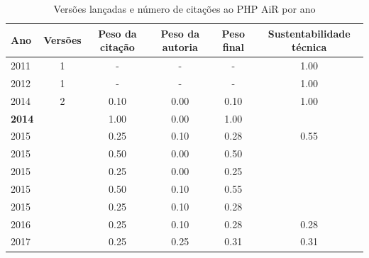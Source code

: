 \begin{table}[H]
\caption{Versões lançadas e número de citações ao PHP AiR por ano}
\centering
\begin{tabular}{| l | c | c | c | c | c |}
  \hline
  Ano & Versões & Peso da citação & Peso da autoria & Peso final & Sustentabilidade técnica \\
  \hline
        2011 & 1 & - & - & -
        &
          {\color{blue} 1.00}
        \\
\hline
        2012 & 1 & - & - & -
        &
          {\color{blue} 1.00}
        \\
\hline
            2014
          &
          2
          &
          0.10
          &
          0.00
          &
          0.10
          &
            {\color{blue} 1.00}
          \\
            {\bf 2014}
          &
          
          &
          1.00
          &
          0.00
          &
          1.00
          &
          \\
\hline
            2015
          &
          
          &
          0.25
          &
          0.10
          &
          0.28
          &
            {\color{blue} 0.55}
          \\
            2015
          &
          
          &
          0.50
          &
          0.00
          &
          0.50
          &
          \\
            2015
          &
          
          &
          0.25
          &
          0.00
          &
          0.25
          &
          \\
            2015
          &
          
          &
          0.50
          &
          0.10
          &
          0.55
          &
          \\
            2015
          &
          
          &
          0.25
          &
          0.10
          &
          0.28
          &
          \\
\hline
            2016
          &
          
          &
          0.25
          &
          0.10
          &
          0.28
          &
            {\color{red} 0.28}
          \\
\hline
            2017
          &
          
          &
          0.25
          &
          0.25
          &
          0.31
          &
            {\color{red} 0.31}
          \\
\hline
\end{tabular}
\end{table}

